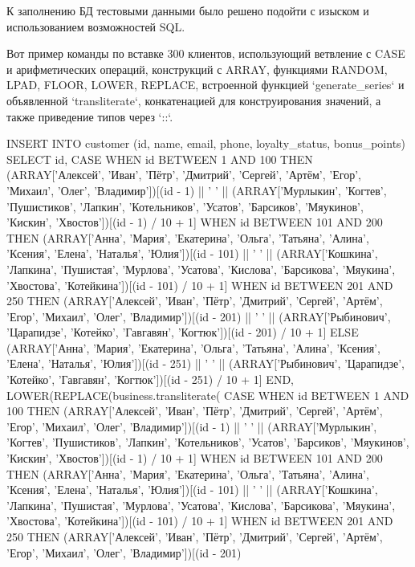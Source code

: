 К заполнению БД тестовыми данными было решено подойти с изыском и использованием возможностей SQL\@.

Вот пример команды по вставке 300 клиентов, использующий ветвление с CASE и арифметических операций,
конструкций с ARRAY, функциями RANDOM, LPAD, FLOOR, LOWER, REPLACE, встроенной функцией `generate\_series`
и объявленной `transliterate`, конкатенацией для конструирования значений, а также приведение типов через `::`.

\begin{sql}[language=sql, frame=single, basicstyle=\normalsize\ttfamily, breaklines=true,label={lst:examplecustomer}]
INSERT INTO customer (id, name, email, phone, loyalty_status, bonus_points)
SELECT
id,
CASE
WHEN id BETWEEN 1 AND 100 THEN
(ARRAY['Алексей', 'Иван', 'Пётр', 'Дмитрий', 'Сергей', 'Артём', 'Егор', 'Михаил', 'Олег', 'Владимир'])[(id - 1) %
|| ' ' || (ARRAY['Мурлыкин', 'Когтев', 'Пушистиков', 'Лапкин', 'Котельников', 'Усатов', 'Барсиков', 'Мяукинов', 'Кискин', 'Хвостов'])[(id - 1) / 10 + 1]
WHEN id BETWEEN 101 AND 200 THEN
(ARRAY['Анна', 'Мария', 'Екатерина', 'Ольга', 'Татьяна', 'Алина', 'Ксения', 'Елена', 'Наталья', 'Юлия'])[(id - 101) %
|| ' ' || (ARRAY['Кошкина', 'Лапкина', 'Пушистая', 'Мурлова', 'Усатова', 'Кислова', 'Барсикова', 'Мяукина', 'Хвостова', 'Котейкина'])[(id - 101) / 10 + 1]
WHEN id BETWEEN 201 AND 250 THEN
(ARRAY['Алексей', 'Иван', 'Пётр', 'Дмитрий', 'Сергей', 'Артём', 'Егор', 'Михаил', 'Олег', 'Владимир'])[(id - 201) %
|| ' ' || (ARRAY['Рыбинович', 'Царапидзе', 'Котейко', 'Гавгавян', 'Когтюк'])[(id - 201) / 10 + 1]
ELSE
(ARRAY['Анна', 'Мария', 'Екатерина', 'Ольга', 'Татьяна', 'Алина', 'Ксения', 'Елена', 'Наталья', 'Юлия'])[(id - 251) %
|| ' ' || (ARRAY['Рыбинович', 'Царапидзе', 'Котейко', 'Гавгавян', 'Когтюк'])[(id - 251) / 10 + 1]
END,
LOWER(REPLACE(business.transliterate(
CASE
WHEN id BETWEEN 1 AND 100 THEN
(ARRAY['Алексей', 'Иван', 'Пётр', 'Дмитрий', 'Сергей', 'Артём', 'Егор', 'Михаил', 'Олег', 'Владимир'])[(id - 1) %
|| ' ' || (ARRAY['Мурлыкин', 'Когтев', 'Пушистиков', 'Лапкин', 'Котельников', 'Усатов', 'Барсиков', 'Мяукинов', 'Кискин', 'Хвостов'])[(id - 1) / 10 + 1]
WHEN id BETWEEN 101 AND 200 THEN
(ARRAY['Анна', 'Мария', 'Екатерина', 'Ольга', 'Татьяна', 'Алина', 'Ксения', 'Елена', 'Наталья', 'Юлия'])[(id - 101) %
|| ' ' || (ARRAY['Кошкина', 'Лапкина', 'Пушистая', 'Мурлова', 'Усатова', 'Кислова', 'Барсикова', 'Мяукина', 'Хвостова', 'Котейкина'])[(id - 101) / 10 + 1]
WHEN id BETWEEN 201 AND 250 THEN
(ARRAY['Алексей', 'Иван', 'Пётр', 'Дмитрий', 'Сергей', 'Артём', 'Егор', 'Михаил', 'Олег', 'Владимир'])[(id - 201) %

\end{sql}
